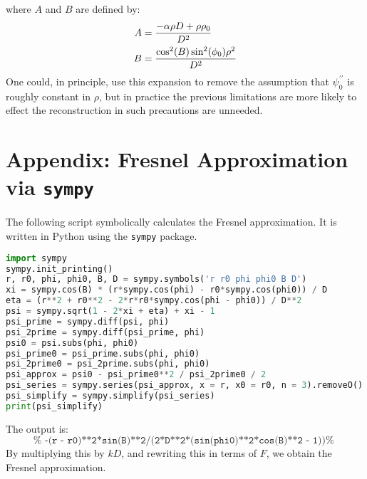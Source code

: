 \documentclass{article}
\theoremstyle{plain}
\begin{document}
        where $A$ and $B$ are defined by:
        \begin{subequations}
            \begin{align}
                A&=\frac{-\alpha\rho{D}+\rho\rho_{0}}{D^{2}}\\
                B&=\frac{%
                    \cos^{2}(B)\sin^{2}(\phi_{0})\rho^{2}
                }{%
                    D^{2}
                }
            \end{align}
        \end{subequations}
        One could, in principle, use this expansion to remove the assumption
        that $\psi^{\prime\prime}_{0}$ is roughly constant in $\rho$, but in
        practice the previous limitations are more likely to effect the
        reconstruction in such precautions are unneeded.
    \setcounter{secnumdepth}{0}
    \section{Appendix: Fresnel Approximation via \texttt{sympy}}
        The following script symbolically calculates the Fresnel approximation.
        It is written in Python using the \texttt{sympy} package.
        \begin{lstlisting}[language = Python]
import sympy
sympy.init_printing()
r, r0, phi, phi0, B, D = sympy.symbols('r r0 phi phi0 B D')
xi = sympy.cos(B) * (r*sympy.cos(phi) - r0*sympy.cos(phi0)) / D
eta = (r**2 + r0**2 - 2*r*r0*sympy.cos(phi - phi0)) / D**2
psi = sympy.sqrt(1 - 2*xi + eta) + xi - 1
psi_prime = sympy.diff(psi, phi)
psi_2prime = sympy.diff(psi_prime, phi)
psi0 = psi.subs(phi, phi0)
psi_prime0 = psi_prime.subs(phi, phi0)
psi_2prime0 = psi_2prime.subs(phi, phi0)
psi_approx = psi0 - psi_prime0**2 / psi_2prime0 / 2
psi_series = sympy.series(psi_approx, x = r, x0 = r0, n = 3).removeO()
psi_simplify = sympy.simplify(psi_series)
print(psi_simplify)
        \end{lstlisting}
        The output is:
        \begin{equation}
            \texttt{%
                -(r - r0)**2*sin(B)**2/(2*D**2*(sin(phi0)**2*cos(B)**2 - 1))%
            }
        \end{equation}
        By multiplying this by $kD$, and rewriting this in terms of $F$,
        we obtain the Fresnel approximation.
    
    
\end{document}

